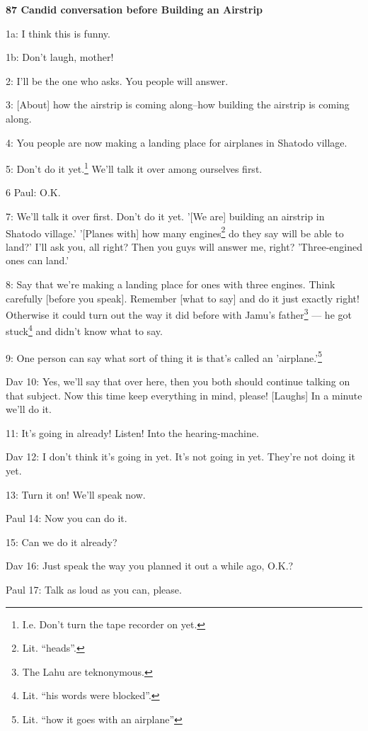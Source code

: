 
\textbf{87 Candid conversation before Building an Airstrip}

1a: I think this is funny.

1b: Don't laugh, mother!

2: I'll be the one who asks. You people will answer.

3: [About] how the airstrip is coming along--how building the airstrip is coming
along.

4: You people are now making a landing place for airplanes in Shatodo village.

5: Don't do it yet.\footnote{I.e. Don't turn the tape recorder on yet.} We'll talk it over among ourselves first.

6 Paul: O.K.

7: We'll talk it over first. Don't do it yet. '[We are] building an airstrip in
Shatodo village.' '[Planes with] how many engines\footnote{Lit. ``heads''.} do they say will be able to
land?' I'll ask you, all right? Then you guys will answer me, right? 'Three-engined
ones can land.'

8: Say that we're making a landing place for ones with three engines. Think carefully
[before you speak]. Remember [what to say] and do it just exactly right! Otherwise
it could turn out the way it did before with Jamu's father\footnote{The Lahu are teknonymous.} --- he got stuck\footnote{Lit. ``his words were blocked''.}
and didn't know what to say.

9: One person can say what sort of thing it is that's called an 'airplane.'\footnote{Lit. ``how it goes with an airplane''}

Dav 10: Yes, we'll say that over here, then you both should continue talking on
that subject. Now this time keep everything in mind, please! [Laughs] In a minute
we'll do it.

11: It's going in already! Listen! Into the hearing-machine.

Dav 12: I don't think it's going in yet. It's not going in yet. They're not doing
it yet.

13: Turn it on! We'll speak now.

Paul 14: Now you can do it.

15: Can we do it already?

Dav 16: Just speak the way you planned it out a while ago, O.K.?

Paul 17: Talk as loud as you can, please.

